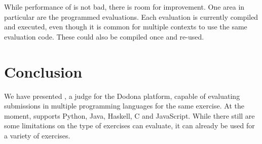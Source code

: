 \documentclass[5p,number]{elsarticle}
\begin{document}
    While performance of \tested{} is not bad, there is room for improvement.
    One area in particular are the programmed evaluations.
    Each evaluation is currently compiled and executed, even though it is common for multiple contexts to use the same evaluation code.
    These could also be compiled once and re-used.
    
    \section{Conclusion}\label{sec:conclusion}
    
    We have presented \tested{}, a judge for the Dodona platform, capable of evaluating submissions in multiple programming languages for the same exercise.
    At the moment, \tested{} supports Python, Java, Haskell, C and JavaScript.
    While there still are some limitations on the type of exercises \tested{} can evaluate, it can already be used for a variety of exercises.

    
    
\end{document}
